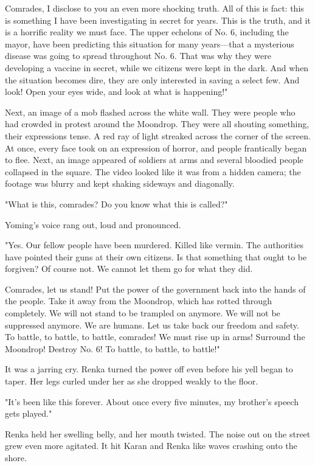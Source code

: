 Comrades, I disclose to you an even more shocking truth. All of this is
fact: this is something I have been investigating in secret for years.
This is the truth, and it is a horrific reality we must face. The upper
echelons of No. 6, including the mayor, have been predicting this
situation for many years---that a mysterious disease was going to spread
throughout No. 6. That was why they were developing a vaccine in secret,
while we citizens were kept in the dark. And when the situation becomes
dire, they are only interested in saving a select few. And look! Open
your eyes wide, and look at what is happening!"

Next, an image of a mob flashed across the white wall. They were people
who had crowded in protest around the Moondrop. They were all shouting
something, their expressions tense. A red ray of light streaked across
the corner of the screen. At once, every face took on an expression of
horror, and people frantically began to flee. Next, an image appeared of
soldiers at arms and several bloodied people collapsed in the square.
The video looked like it was from a hidden camera; the footage was
blurry and kept shaking sideways and diagonally.

"What is this, comrades? Do you know what this is called?"

Yoming's voice rang out, loud and pronounced.

"Yes. Our fellow people have been murdered. Killed like vermin. The
authorities have pointed their guns at their own citizens. Is that
something that ought to be forgiven? Of course not. We cannot let them
go for what they did.

Comrades, let us stand! Put the power of the government back into the
hands of the people. Take it away from the Moondrop, which has rotted
through completely. We will not stand to be trampled on anymore. We will
not be suppressed anymore. We are humans. Let us take back our freedom
and safety. To battle, to battle, to battle, comrades! We must rise up
in arms! Surround the Moondrop! Destroy No. 6! To battle, to battle, to
battle!"

It was a jarring cry. Renka turned the power off even before his yell
began to taper. Her legs curled under her as she dropped weakly to the
floor.

"It's been like this forever. About once every five minutes, my
brother's speech gets played."

Renka held her swelling belly, and her mouth twisted. The noise out on
the street grew even more agitated. It hit Karan and Renka like waves
crashing onto the shore.

